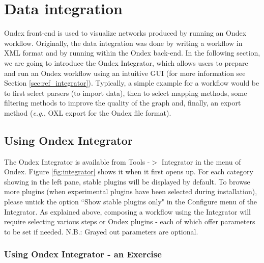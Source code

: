 \chapter{Data integration}
\label{cha:integration}

Ondex front-end is used to visualize networks produced by running an Ondex workflow. 
Originally, the data integration was done by writing a workflow in XML format and by running within the Ondex back-end. 
In the following section, we are going to introduce the Ondex Integrator, which allows users to prepare and run an Ondex workflow using an intuitive GUI 
(for more information see Section \ref{sec:ref_integrator}).
Typically, a simple example for a workflow would be to first select parsers (to import data), then to select mapping methods, 
some filtering methods to improve the quality of the graph and, finally, an export method ({\it{e.g.}}, OXL export for the Ondex file format).


\section{Using Ondex Integrator}
\label{sec:integrator}

The Ondex Integrator is available from Tools -$>$ Integrator in the menu of Ondex. 
Figure \ref{fig:integrator} shows it when it first opens up.
For each category showing in the left pane, stable plugins will be displayed by default.
To browse more plugins (when experimental plugins have been selected during installation), 
please untick the option ``Show stable plugins only" in the Configure menu of the Integrator.
As explained above, composing a workflow using the Integrator will require selecting various steps or Ondex plugins -
each of which offer parameters to be set if needed.
N.B.: Grayed out parameters are optional. 

\subsection{Using Ondex Integrator - an Exercise}
\label{sec:integrator_exercise}

